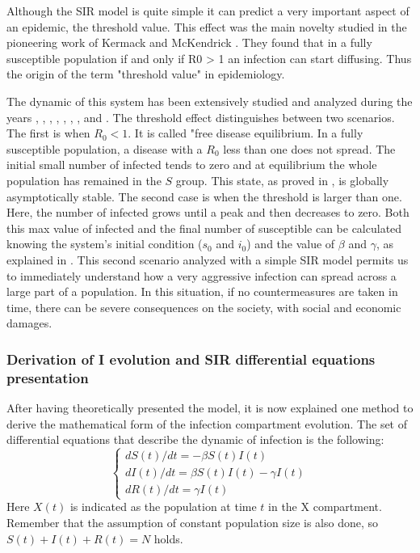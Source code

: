 Although the SIR model is quite simple it can predict a very important aspect of an epidemic, the threshold value. This effect was the main novelty studied in the pioneering work of Kermack and McKendrick \cite{kermack1927}. They found that in a fully susceptible population if and only if R0 > 1 an infection can start diffusing. Thus the origin of the term "threshold value" in epidemiology. 

The dynamic of this system has been extensively studied and analyzed during the years \cite{Breda_2012}, \cite{akinboro2014numerical}, \cite{Jard_n_Kojakhmetov_2021}, \cite{Ledder_2023}, \cite{Okabe_2020}, \cite{Prodanov_2022}, \cite{Xu_2014}, and \cite{Turkyilmazoglu_2021}. The threshold effect distinguishes between two scenarios. The first is when $R_0 <1 $. It is called "free disease equilibrium. 
In a fully susceptible population, a disease with a $R_0$ less than one does not spread. The initial small number of infected tends to zero and at equilibrium the whole population has remained in the $S$ group. This state, as proved in \cite{Hernandez_Vargas_2022}, is globally asymptotically stable. The second case is when the threshold is larger than one. Here, the number of infected grows until a peak and then decreases to zero. Both this max value of infected and the final number of susceptible can be calculated knowing the system's initial condition ($s_0$ and $i_0$) and the value of $\beta$ and $\gamma$, as explained in \cite{Hethcote_2000}. 
This second scenario analyzed with a simple SIR model permits us to immediately understand how a very aggressive infection can spread across a large part of a population. In this situation, if no countermeasures are taken in time, there can be severe consequences on the society, with social and economic damages. 

\subsubsection{Derivation of I evolution and SIR differential equations presentation}
After having theoretically presented the model, it is now explained one method to derive the mathematical form of the infection compartment evolution. 
The set of differential equations that  describe the dynamic of infection is the following:
\begin{equation}
	\begin{cases}
		dS(t) / dt = -\beta S(t) I(t)\\
		dI(t) / dt = \beta S(t) I(t) - \gamma I(t)\\
		dR(t) / dt =  \gamma I(t)
	\end{cases}
\end{equation}
Here $X(t)$ is indicated as the population at time $t$ in the X compartment. Remember that the assumption of constant population size is also done, so $S(t)+I(t)+R(t) = N$ holds.

